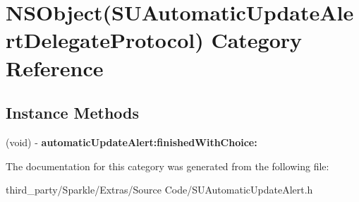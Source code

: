 \hypertarget{category_n_s_object_07_s_u_automatic_update_alert_delegate_protocol_08}{}\section{N\+S\+Object(S\+U\+Automatic\+Update\+Alert\+Delegate\+Protocol) Category Reference}
\label{category_n_s_object_07_s_u_automatic_update_alert_delegate_protocol_08}
\subsection*{Instance Methods}
\begin{DoxyCompactItemize}
\item 
\mbox{\label{category_n_s_object_07_s_u_automatic_update_alert_delegate_protocol_08_a4d11c0ec73fe48b97e3538ebb2358df4}} 
(void) -\/ {\bfseries automatic\+Update\+Alert\+:finished\+With\+Choice\+:}
\end{DoxyCompactItemize}


The documentation for this category was generated from the following file\+:\begin{DoxyCompactItemize}
\item 
third\+\_\+party/\+Sparkle/\+Extras/\+Source Code/S\+U\+Automatic\+Update\+Alert.\+h\end{DoxyCompactItemize}
